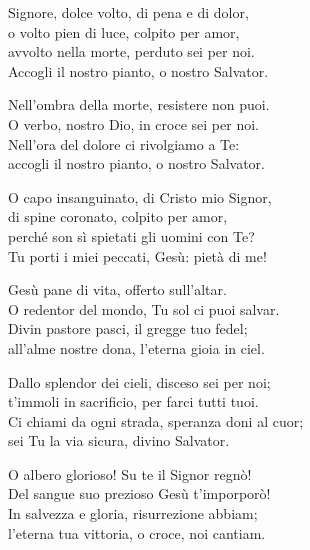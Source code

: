 
\strofa Signore, dolce volto, di pena e di dolor,\\
o volto pien di luce, colpito per amor,\\
avvolto nella morte, perduto sei per noi.\\
Accogli il nostro pianto, o nostro Salvator.

\spazio

\strofa Nell'ombra della morte, resistere non puoi.\\
O verbo, nostro Dio, in croce sei per noi.\\
Nell'ora del dolore ci rivolgiamo a Te:\\
accogli il nostro pianto, o nostro Salvator.

\spazio

\strofa O capo insanguinato, di Cristo mio Signor,\\
di spine coronato, colpito per amor,\\
perché son sì spietati gli uomini con Te?\\
Tu porti i miei peccati, Gesù: pietà di me!

\spazio

\strofa Gesù pane di vita, offerto sull'altar.\\
O redentor del mondo, Tu sol ci puoi salvar.\\
Divin pastore pasci, il gregge tuo fedel;\\
all'alme nostre dona, l'eterna gioia in ciel.

\spazio

\strofa Dallo splendor dei cieli, disceso sei per noi;\\
t'immoli in sacrificio, per farci tutti tuoi.\\
Ci chiami da ogni strada, speranza doni al cuor;\\
sei Tu la via sicura, divino Salvator.

\spazio

\strofa O albero glorioso! Su te il Signor regnò!\\
Del sangue suo prezioso Gesù t'imporporò!\\
In salvezza e gloria, risurrezione abbiam;\\
l'eterna tua vittoria, o croce, noi cantiam.